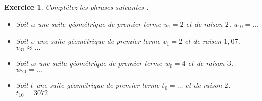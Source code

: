 \documentclass[10pt,a4paper]{article}
\newtheorem{exo}{Exercice}
\begin{document}
\vspace{10mm}
\begin{exo}
    Complétez les phrases suivantes :
    \begin{itemize}
        \item Soit $u$ une suite géométrique de premier terme $u_1=2$ et de raison $2$. $u_{10}= \ldots$
        \item Soit $v$ une suite géométrique de premier terme $v_1=2$ et de raison $1{,}07$. $v_{31} \approx \ldots$
        \item Soit $w$ une suite géométrique de premier terme $w_0=4$ et de raison $3$. $w_{20}= \ldots$
        \item Soit $t$ une suite géométrique de premier terme $t_0= \ldots$ et de raison $2$. $t_{10}=3072$
    \end{itemize}
\end{exo}
\end{document}
